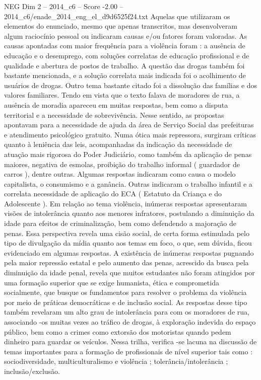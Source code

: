 \begin{textsample}{NEG Dim 2 – 2014\_c6 – Score -2.00 – 2014\_c6/enade\_2014\_eng\_el\_d9d6525f24.txt}
Aquelas que utilizaram os elementos do enunciado, mesmo que apenas transcritos, mas desenvolveram algum raciocínio pessoal ou indicaram causas e/ou fatores foram valoradas.
As causas apontadas com maior frequência para a violência foram : a ausência de educação e o desemprego, com soluções correlatas de educação profissional e de qualidade e abertura de postos de trabalho.
A questão das drogas também foi bastante mencionada, e a solução correlata mais indicada foi o acolhimento de usuários de drogas.
Outro tema bastante citado foi a dissolução das famílias e dos valores familiares.
Tendo em vista que o texto falava de moradores de rua, a ausência de moradia apareceu em muitas respostas, bem como a disputa territorial e a necessidade de sobrevivência.
Nesse sentido, as propostas apontavam para a necessidade de ajuda da área de Serviço Social das prefeituras e atendimento psicológico gratuito.
Numa ótica mais repressora, surgiram críticas quanto à leniência das leis, acompanhadas da indicação da necessidade de atuação mais rigorosa do Poder Judiciário, como também da aplicação de penas maiores, negativa de esmolas, proibição do trabalho informal ( guardador de carros ), dentre outras.
Algumas respostas indicaram como causa o modelo capitalista, o consumismo e a ganância.
Outras indicaram o trabalho infantil e a correlata necessidade de aplicação do ECA ( Estatuto da Criança e do Adolescente ).
Em relação ao tema violência, inúmeras respostas apresentaram visões de intolerância quanto aos menores infratores, postulando a diminuição da idade para efeitos de criminalização, bem como defendendo a majoração de penas.
Essa perspectiva revela uma cisão social, de certa forma estimulada pelo tipo de divulgação da mídia quanto aos temas em foco, o que, sem dúvida, ficou evidenciado em algumas respostas.
A existência de inúmeras respostas pugnando pela maior repressão estatal e pelo aumento das penas, acrescido da busca pela diminuição da idade penal, revela que muitos estudantes não foram atingidos por uma formação superior que se exige humanista, ética e comprometida socialmente, que busque os fundamentos para resolver o problema da violência por meio de práticas democráticas e de inclusão social.
As respostas desse tipo também revelaram um alto grau de intolerância para com os moradores de rua, associando -os muitas vezes ao tráfico de drogas, à exploração indevida do espaço público, bem como a crimes como extorsão dos motoristas quando pedem dinheiro para guardar os veículos.
Nessa trilha, verifica -se lacuna na discussão de temas importantes para a formação de profissionais de nível superior tais como : sociodiversidade, multiculturalismo e violência ; tolerância/intolerância ; inclusão/exclusão.

\end{textsample}

